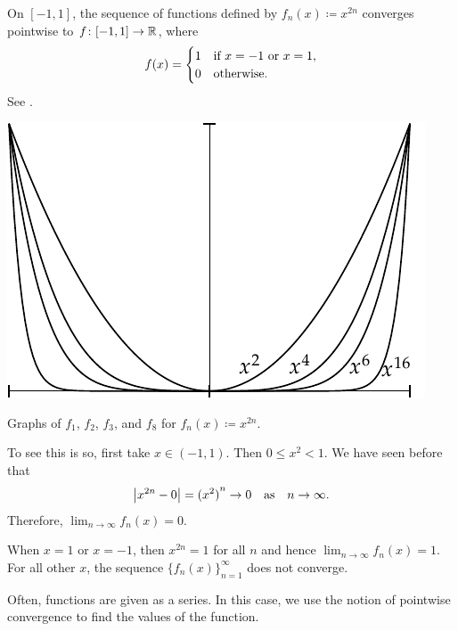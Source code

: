 \begin{example}
On $[-1,1]$, the sequence of functions defined by $f_n(x) \coloneqq x^{2n}$
converges pointwise to $f \colon [-1,1] \to {\mathbb{R}}$, where
\begin{equation*}
f(x) =
\begin{cases}
1 & \text{if } x=-1 \text{ or } x=1, \\
0 & \text{otherwise.}
\end{cases}
\avoidbreak
\end{equation*}
See .

\begin{myfigureht}
\includegraphics{figures/x2nfig}
\caption{Graphs of $f_1$, $f_2$, $f_3$, and $f_8$ for $f_n(x) \coloneqq
x^{2n}$.\label{x2nfig}}
\end{myfigureht}

To see this is so, first take $x \in (-1,1)$.  Then 
$0 \leq x^2 < 1$.
We have seen before that
\begin{equation*}
\left\lvert {x^{2n} - 0} \right\rvert = {(x^2)}^n \to 0 \quad \text{as} \quad n \to \infty .
\end{equation*}
Therefore, $\lim_{n\to\infty}f_n(x) = 0$.

When $x = 1$ or $x=-1$, then $x^{2n} = 1$ for all $n$ and hence
$\lim_{n\to\infty}f_n(x) = 1$.
For all other $x$, the sequence
$\bigl\{ f_n(x) \bigr\}_{n=1}^\infty$ does not converge.
\end{example}

Often, functions are given as a series.  In this case, we use
the notion of pointwise convergence to find the values of the function.

